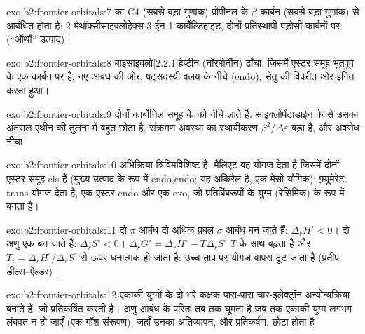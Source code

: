 \begin{solution}{exo:b2:frontier-orbitals:7}
 का C4 (सबसे बड़ा  गुणांक) प्रोपीनल के $\beta$ कार्बन (सबसे बड़ा
 गुणांक) से आबंधित होता है: 2-मेथॉक्सीसाइक्लोहेक्स-3-ईन-1-कार्बैल्डिहाइड, दोनों प्रतिस्थापी
पड़ोसी कार्बनों पर (``ऑर्थो'' उत्पाद)।
\end{solution}

\begin{solution}{exo:b2:frontier-orbitals:8}
बाइसाइक्लो[2.2.1]हेप्टीन (नॉरबोर्नीन) ढाँचा, जिसमें एस्टर समूह भूतपूर्व  के
एक कार्बन पर है, नए  आबंध की ओर, षट्सदस्यी वलय के नीचे
(endo),  सेतु की विपरीत ओर इंगित करता हुआ।
\end{solution}

\begin{solution}{exo:b2:frontier-orbitals:9}
दोनों कार्बोनिल समूह  के  को नीचे लाते हैं: साइक्लोपेंटाडाईन के  से उसका
अंतराल एथीन की तुलना में बहुत छोटा है, संक्रमण अवस्था का स्थायीकरण $\beta^2/\Delta\varepsilon$
बड़ा है, और अवरोध नीचा।
\end{solution}

\begin{solution}{exo:b2:frontier-orbitals:10}
अभिक्रिया त्रिविमविशिष्ट है: मैलिएट वह योगज देता है जिसमें दोनों एस्टर समूह cis हैं
(मुख्य उत्पाद के रूप में endo,endo; यह अकिरैल है, एक मेसो यौगिक); फ़्यूमेरेट
trans योगज देता है, एक एस्टर endo और एक exo, जो प्रतिबिंबरूपों के युग्म (रेसिमिक) के रूप में बनता है।
\end{solution}

\begin{solution}{exo:b2:frontier-orbitals:11}
दो $\pi$ आबंध दो अधिक प्रबल $\sigma$ आबंध बन जाते हैं: $\Delta_r H^\circ < 0$। दो अणु एक बन जाते हैं:
$\Delta_r S^\circ < 0$। $\Delta_r G^\circ = \Delta_r H^\circ - T\Delta_r S^\circ$ $T$ के साथ बढ़ता है और
$T_i = \Delta_r H^\circ/\Delta_r S^\circ$ से ऊपर धनात्मक हो जाता है: उच्च ताप पर योगज वापस टूट जाता है
(प्रतीप डील्स--ऐल्डर)।
\end{solution}

\begin{solution}{exo:b2:frontier-orbitals:12}
एकाकी युग्मों के दो भरे कक्षक पास-पास चार-इलेक्ट्रॉन अन्योन्यक्रिया बनाते हैं, जो
प्रतिकर्षित करती है। अणु  आबंध के परितः तब तक घूमता है जब तक एकाकी युग्म लगभग
लंबवत न हो जाएँ (एक गॉश संरूपण), जहाँ उनका अतिव्यापन, और प्रतिकर्षण,
छोटा होता है।
\end{solution}

